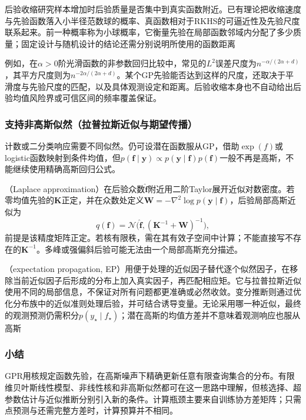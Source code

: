 后验收缩研究样本增加时后验质量是否集中到真实函数附近。已有理论把收缩速度与先验函数落入小半径范数球的概率、真函数相对于RKHS的可逼近性及先验尺度联系起来。前一种概率称为小球概率，它衡量先验在局部函数邻域内分配了多少质量；固定设计与随机设计的结论还需分别说明所使用的函数距离

例如，在$\alpha>0$阶光滑函数的非参数回归比较中，常见的$L^2$误差尺度为$n^{-\alpha/(2\alpha+d)}$，其平方尺度则为$n^{-2\alpha/(2\alpha+d)}$。某个GP先验能否达到这样的尺度，还取决于平滑度与先验尺度的匹配，以及具体观测设定和距离。后验收缩本身也不自动给出后验均值风险界或可信区间的频率覆盖保证。

\subsubsection{支持非高斯似然（拉普拉斯近似与期望传播）}
\label{sec:regression-gp-nongaussian}

计数或二分类响应需要不同似然。仍可设潜在函数服从GP，借助$\exp(f)$或logistic函数映射到条件均值，但$p(\bm{f}\mid\bm{y})\propto p(\bm{y}\mid\bm{f})p(\bm{f})$一般不再是高斯，不能继续使用精确高斯回归公式。

（Laplace approximation）在后验众数$\widehat{\bm{f}}$附近用二阶Taylor展开近似对数密度。若零均值先验的$\bm{K}$正定，并在众数处定义$\bm{W}=-\nabla^2\log p(\bm{y}\mid\bm{f})$，后验局部高斯近似为
\[
  q(\bm{f})=\mathcal{N}\bigl(
       \widehat{\bm{f}},(\bm{K}^{-1}+\bm{W})^{-1}\bigr),
\]
前提是该精度矩阵正定。若核有限秩，需在其有效子空间中计算；不能直接写不存在的$\bm{K}^{-1}$。多峰或强偏斜后验可能无法由一个局部高斯充分描述。

（expectation propagation, EP）用便于处理的近似因子替代逐个似然因子，在移除当前近似因子后形成的分布上加入真实因子，再匹配相应矩。它与拉普拉斯近似使用不同的局部信息，不保证对所有问题都更准确或必然收敛。变分推断则通过优化分布族中的近似准则处理后验，并可结合诱导变量。无论采用哪一种近似，最终的观测预测仍需积分$p(y_{\star}\mid f_{\star})$；潜在高斯的均值方差并不意味着观测响应也服从高斯

\subsubsection{小结}

GPR用核规定函数先验，在高斯噪声下精确更新任意有限查询集合的分布。有限维贝叶斯线性模型、非线性核和非高斯似然都可在这一思路中理解，但核选择、超参数估计与近似推断分别引入新的条件。计算瓶颈主要来自训练协方差矩阵；只需点预测与还需完整方差时，计算预算并不相同。

